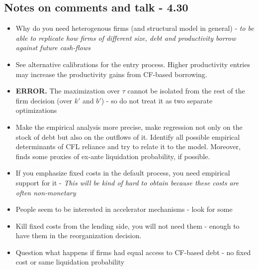 \documentclass[12pt]{article}
\begin{document}
\subsection*{Notes on comments and talk - 4.30}
\begin{itemize} \setlength\itemsep{0em} \small
    \item Why do you need heterogenous firms (and structural model in general) - \textit{to be able to replicate how firms of different size, debt and productivity borrow against future cash-flows}
    \item See alternative calibrations for the entry process. Higher productivity entries may increase the productivity gains from CF-based borrowing. 
    \item \textbf{ERROR.} The maximization over $\tau$ cannot be isolated from the rest of the firm decision (over $k'$ and $b'$) - so do not treat it as two separate optimizations
    \item Make the empirical analysis more precise, make regression not only on the stock of debt but also on the outflows of it. Identify all possible empirical determinants of CFL reliance and try to relate it to the model. Moreover, finds some proxies of ex-ante liquidation probability, if possible. 
    \item If you emphasize fixed costs in the default process, you need empirical support for it - \textit{This will be kind of hard to obtain because these costs are often non-monetary}
    \item People seem to be interested in accelerator mechanisms - look for some 
    \item Kill fixed costs from the lending side, you will not need them - enough to have them in the reorganization decision. 
    \item Question what happens if firms had equal access to CF-based debt - no fixed cost or same liquidation probability
\end{itemize} \normalsize




 
\end{document}
